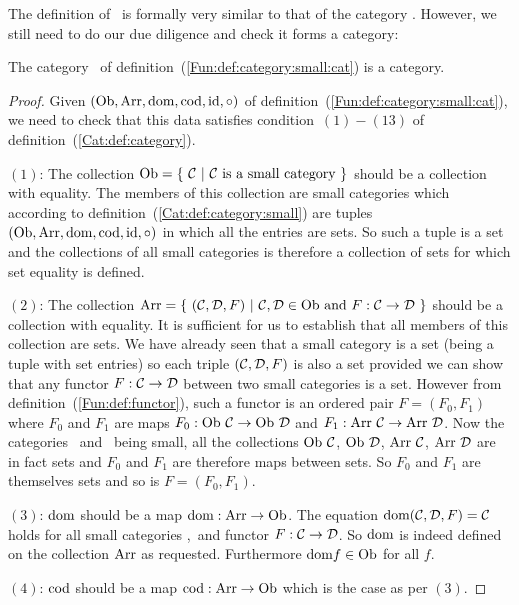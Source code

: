 The definition of \cat\ is formally very similar to that of the category \Set.
However, we still need to do our due diligence and check it forms a category:

\begin{prop}\label{Fun:prop:category:small:cat}
    The category \cat\ of definition~(\ref{Fun:def:category:small:cat}) is 
    a category.
\end{prop}
\begin{proof}
    Given $(\mbox{\rm Ob}, \mbox{\rm Arr}, \mbox{\rm dom}, \mbox{\rm cod}, \mbox{\rm id}, \circ)$ of
    definition~(\ref{Fun:def:category:small:cat}), we need to check that this
    data satisfies condition~$(1)-(13)$ of definition~(\ref{Cat:def:category}).

    $(1)$: The collection $\ob=\{\ \Cat\ |\ \mbox{\Cat\ is a small category}\ \}$
    should be a collection with equality. The members of this collection are 
    small categories which according to definition~(\ref{Cat:def:category:small})
    are tuples $(\mbox{\rm Ob}, \mbox{\rm Arr}, \mbox{\rm dom}, \mbox{\rm cod}, \mbox{\rm id}, \circ)$ in which all the entries
    are sets. So such a tuple is a set and the collections of all small 
    categories is therefore a collection of sets for which set equality is 
    defined.

    $(2)$: The collection $\arr =\{\ (\Cat,\Dat,F)\ |\ \Cat,\Dat\in\ob\  
    \mbox{and}\ F:\Cat\to\Dat\ \}$ should be a collection with equality.
    It is sufficient for us to establish that all members of this collection
    are sets. We have already seen that a small category is a set
    (being a tuple with set entries) so each triple $(\mbox{$\cal C$},\mbox{$\cal D$},F)$ is also
    a set provided we can show that any functor $F:\mbox{$\cal C$}\to\mbox{$\cal D$}$ between two
    small categories is a set. However from definition~(\ref{Fun:def:functor}),
    such a functor is an ordered pair $F=(F_{0},F_{1})$ where $F_{0}$ and 
    $F_{1}$ are maps $F_{0}:\mbox{\rm Ob}\ \mbox{$\cal C$}\to\mbox{\rm Ob}\ \mbox{$\cal D$}$ and 
    $F_{1}:\mbox{\rm Arr}\ \mbox{$\cal C$}\to\mbox{\rm Arr}\ \mbox{$\cal D$}$. Now the categories \Cat\ and \Dat\ being
    small, all the collections $\mbox{\rm Ob}\ \mbox{$\cal C$}$, $\ob\ \Dat$, $\mbox{\rm Arr}\ \mbox{$\cal C$}$, 
    $\mbox{\rm Arr}\ \mbox{$\cal D$}$ are in fact sets and $F_{0}$ and $F_{1}$ are therefore maps
    between sets. So $F_{0}$ and $F_{1}$ are themselves sets and so is 
    $F=(F_{0},F_{1})$.

    $(3)$: $\mbox{\rm dom}$ should be a map $\mbox{\rm dom}:\mbox{\rm Arr}\to\mbox{\rm Ob}$. The equation
    $\mbox{\rm dom}(\mbox{$\cal C$},\mbox{$\cal D$},F)=\mbox{$\cal C$}$ holds for all small categories \Cat,\Dat\ and 
    functor $F:\mbox{$\cal C$}\to\mbox{$\cal D$}$. So $\mbox{\rm dom}$ is indeed defined on the collection
    $\mbox{\rm Arr}$ as requested. Furthermore $\mbox{\rm dom} f \in\mbox{\rm Ob}$ for all $f$.

    $(4)$: $\mbox{\rm cod}$ should be a map $\mbox{\rm cod}:\mbox{\rm Arr}\to\mbox{\rm Ob}$ which is the case 
    as per $(3)$.


\end{proof}
